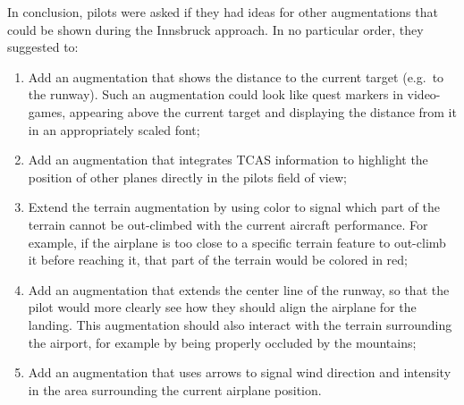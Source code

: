 In conclusion, pilots were asked if they had ideas for other augmentations that could be shown during the Innsbruck approach. In no particular order, they suggested to:

\begin{enumerate}
    \item Add an augmentation that shows the distance to the current target (e.g.\ to the runway). Such an augmentation could look like quest markers in video-games, appearing above the current target and displaying the distance from it in an appropriately scaled font;
    \item Add an augmentation that integrates \gls{TCAS} information to highlight the position of other planes directly in the pilots field of view;
    \item Extend the terrain augmentation by using color to signal which part of the terrain cannot be out-climbed with the current aircraft performance. For example, if the airplane is too close to a specific terrain feature to out-climb it before reaching it, that part of the terrain would be colored in red;
    \item Add an augmentation that extends the center line of the runway, so that the pilot would more clearly see how they should align the airplane for the landing. This augmentation should also interact with the terrain surrounding the airport, for example by being properly occluded by the mountains;
    \item Add an augmentation that uses arrows to signal wind direction and intensity in the area surrounding the current airplane position.
\end{enumerate}